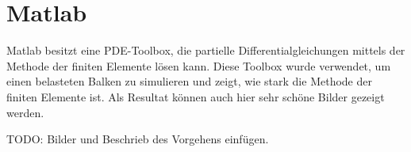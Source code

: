 %
%
%
%
\section{Matlab\label{fem:section:matlab}}

Matlab besitzt eine PDE-Toolbox, die partielle Differentialgleichungen mittels der Methode der finiten Elemente lösen kann.
Diese Toolbox wurde verwendet, um einen belasteten Balken zu simulieren und zeigt, wie stark die Methode der finiten Elemente ist.
Als Resultat können auch hier sehr schöne Bilder gezeigt werden.

TODO: Bilder und Beschrieb des Vorgehens einfügen.